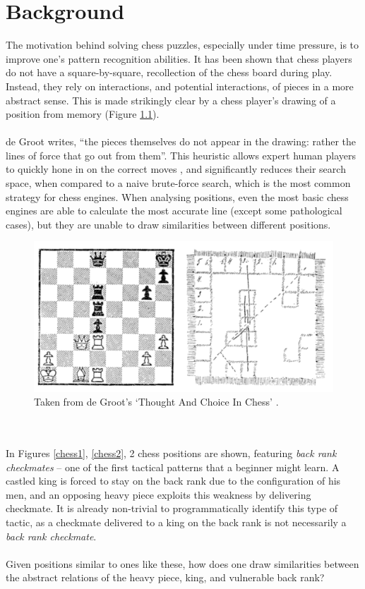 \chapter{Background}
The motivation behind solving chess puzzles, especially under time pressure,
is to improve one's pattern recognition abilities. It has been shown \cite{thoughtAndChoice} 
that chess players do not have a square-by-square, recollection of the chess board 
during play. Instead, they rely on interactions, and potential interactions,
of pieces in a more abstract sense. This is made strikingly clear by a chess 
player's drawing of a position from memory (Figure \ref{deGrootFigure}).
\\~\\
de Groot writes, ``the pieces themselves do not appear in the drawing: 
rather the lines of force that go out from them''. This heuristic allows expert
human players to quickly hone in on the correct moves \cite{bilalic2010mechanisms},
and significantly reduces their search space, when compared to a naive brute-force
search, which is the most common strategy for chess engines. When analysing 
positions, even the most basic chess engines are able to calculate the most 
accurate line (except some pathological cases), but they are unable to draw
similarities between different positions.

\begin{figure}[H]
    \centering
    \includegraphics[width=0.9\linewidth]{background/img/deGroot.png}
    \caption{Taken from de Groot's `Thought And Choice In Chess' \cite{thoughtAndChoice}.}
    \label{deGrootFigure}
\end{figure}
\\~\\
In Figures \ref{chess1}, \ref{chess2}, 2 chess positions are shown, featuring 
\emph{back rank checkmates} -- one of the first tactical patterns that a beginner 
might learn. A castled king is forced to stay on the back rank due to the 
configuration of his men, and an opposing heavy piece exploits this weakness
by delivering checkmate. It is already non-trivial to programmatically identify
this type of tactic, as a checkmate delivered to a king on the back rank is not
necessarily a \emph{back rank checkmate}.
\\~\\
Given positions similar to ones like these, how does one draw similarities 
between the abstract relations of the heavy piece, king, and vulnerable back rank?

